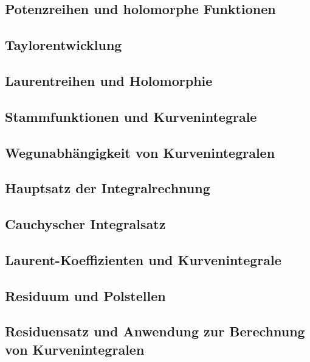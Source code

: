 \subsection{Potenzreihen und holomorphe Funktionen}
\subsection{Taylorentwicklung}
\subsection{Laurentreihen und Holomorphie}
\subsection{Stammfunktionen und Kurvenintegrale}
\subsection{Wegunabhängigkeit von Kurvenintegralen}
\subsection{Hauptsatz der Integralrechnung}
\subsection{Cauchyscher Integralsatz}
\subsection{Laurent-Koeffizienten und Kurvenintegrale}
\subsection{Residuum und Polstellen}
\subsection{Residuensatz und Anwendung zur Berechnung von Kurvenintegralen}